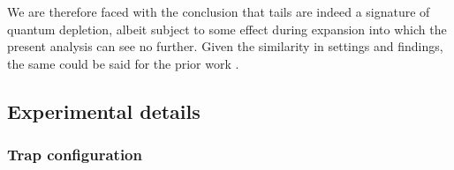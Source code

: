 	We are therefore faced with the conclusion that tails are indeed a signature of quantum depletion, albeit subject to some effect during expansion into which the present analysis can see no further.
	Given the similarity in settings and findings, the same could be said for the prior work \cite{Chang16}.
	
	
	
	
	
	
	


\subsection{Experimental details}
\label{sec:exp_details}
\subsubsection{Trap configuration}

